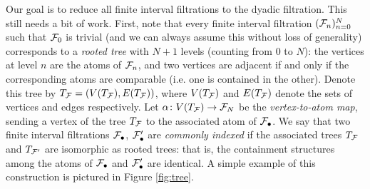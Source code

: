 Our goal is to reduce all finite interval filtrations to the dyadic filtration.
This still needs a bit of work.
First, note that every finite interval filtration $(\mathcal{F}_{n})_{n=0}^{N}$ such that $\mathcal{F}_{0}$ is trivial (and we can always assume this without loss of generality) corresponds to a \emph{rooted tree} with $N+1$ levels (counting from $0$ to $N$): the vertices at level $n$ are the atoms of $\mathcal{F}_{n}$, and two vertices are adjacent if and only if the corresponding atoms are comparable (i.e. one is contained in the other).
Denote this tree by $T_{\mathcal{F}} = (V(T_{\mathcal{F}}), E(T_{\mathcal{F}}))$, where $V(T_{\mathcal{F}})$ and $E(T_{\mathcal{F}})$ denote the sets of vertices and edges respectively.
Let $\alpha \colon V(T_{\mathcal{F}}) \to \mathcal{F}_{N}$ be the \emph{vertex-to-atom map}, sending a vertex of the tree $T_{\mathcal{F}}$ to the associated atom of $\mathcal{F}_{\bullet}$.
We say that two finite interval filtrations $\mathcal{F}_{\bullet}$, $\mathcal{F}'_{\bullet}$ are \emph{commonly indexed} if the associated trees $T_{\mathcal{F}}$ and $T_{\mathcal{F}'}$ are isomorphic as rooted trees: that is, the containment structures among the atoms of $\mathcal{F}_{\bullet}$ and $\mathcal{F}'_{\bullet}$ are identical.
A simple example of this construction is pictured in Figure \ref{fig:tree}.

